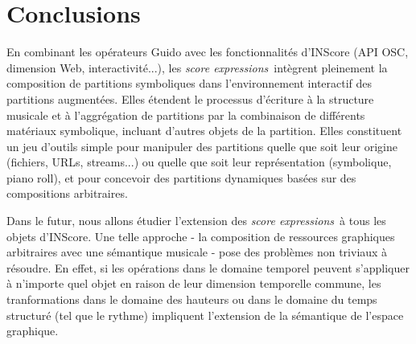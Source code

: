 \documentclass{article}
\newcommand{\sExpr}{\emph{score expression}}
\newcommand{\sExprs}{\emph{score expressions}}
\begin{document}
\section{Conclusions}

En combinant les opérateurs Guido avec les fonctionnalités d'INScore (API OSC, dimension Web, interactivité...), les \sExprs\ intègrent pleinement la composition de partitions symboliques dans l'environnement interactif des partitions augmentées. Elles étendent le processus d'écriture à la structure musicale et à l'aggrégation de partitions par la combinaison de différents matériaux symbolique, incluant d'autres objets de la partition. Elles constituent un jeu d'outils simple pour manipuler des partitions quelle que soit leur origine (fichiers, URLs, streams...) ou quelle que soit leur représentation (symbolique, piano roll), et pour concevoir des partitions dynamiques basées sur des compositions arbitraires.


Dans le futur, nous allons étudier l'extension des \sExprs\ à tous les objets d'INScore. Une telle approche - la composition de ressources graphiques arbitraires avec une sémantique musicale - pose des problèmes non triviaux à résoudre. En effet, si les opérations dans le domaine temporel peuvent s'appliquer à n'importe quel objet en raison de leur dimension temporelle commune, les tranformations dans le domaine des hauteurs ou dans le domaine du temps structuré (tel que le rythme) impliquent l'extension de la sémantique de l'espace graphique.


\balance


\end{document}
